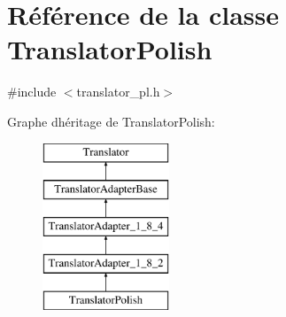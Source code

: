 \hypertarget{class_translator_polish}{}\section{Référence de la classe Translator\+Polish}
\label{class_translator_polish}


{\ttfamily \#include $<$translator\+\_\+pl.\+h$>$}

Graphe d\textquotesingle{}héritage de Translator\+Polish\+:\begin{figure}[H]
\begin{center}
\leavevmode
\includegraphics[height=5.000000cm]{class_translator_polish}
\end{center}
\end{figure}
